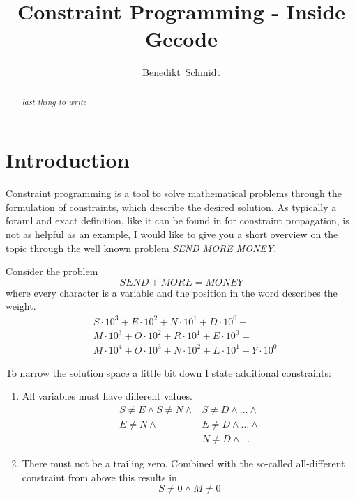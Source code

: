 \documentclass[10pt,
               a4paper,
               journal,
               ]{IEEEtran}
\makeatletter
\def\markboth#1#2{\def\leftmark{\@IEEEcompsoconly{\sffamily}\MakeUppercase{\protect#1}}%
\def\rightmark{\@IEEEcompsoconly{\sffamily}\MakeUppercase{\protect#2}}}
\makeatother
\begin{document}
	\title{Constraint Programming - Inside Gecode}
	\author{Benedikt~Schmidt}
	\markboth{Advanced Seminar for Security in Information Technology, Summer Term 2014}%
	{Benedikt Schmidt: Constraint Programming - Inside Gecode}	
	\maketitle	
	
	\begin{abstract}	
		\textit{last thing to write}	
	\end{abstract}
	
	\section{Introduction}
	Constraint programming is a tool to solve mathematical problems through the formulation of constraints, which describe the desired solution. As typically a foraml and exact definition, like it can be found in \cite[p. 16]{handbookCP} for constraint propagation, is not as helpful as an example, I would like to give you a short overview on the topic through the well known problem \emph{SEND MORE MONEY}.
	
	Consider the problem
	\[SEND + MORE = MONEY\]
	where every character is a variable and the position in the word describes the weight.
	\begin{equation}
	\label{eq:linearConstraint}
	\begin{split}
		& S \cdot 10^3 + E \cdot 10^2 + N \cdot 10^1 + D \cdot 10^0 + \\ 
		& M \cdot 10^3 + O \cdot 10^2 + R \cdot 10^1 + E \cdot 10^0 = \\ 
		& M \cdot 10^4 + O \cdot 10^3 + N \cdot 10^2 + E \cdot 10^1 + Y \cdot 10^0
	\end{split}
	\end{equation}		
	
	To narrow the solution space a little bit down I state additional constraints:
	\begin{enumerate}
	\item All variables must have different values.
		\begin{equation}
		\begin{split}
			S \ne E \land S \ne N \land & S \ne D \land \dots \land \\
			E \ne N \land & E \ne D \land \dots \land \\
			& N \ne D \land \dots
		\end{split}
		\end{equation}	
	\item There must not be a trailing zero. Combined with the so-called all-different constraint \cite{allDifferent} from above this results in
		\begin{equation}
			S \ne 0 \land M \ne 0
		\end{equation}
	\end{enumerate}
	
\end{document}
